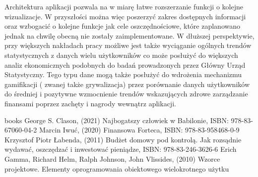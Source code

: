 \documentclass[a4paper, 10pt, twoside, openright]{report}
\begin{document}
\begin{large}
{Architektura aplikacji pozwala na w miarę łatwe rozszerzanie funkcji o kolejne 
wizualizacje. W przyszłości można więc poszerzyć zakres dostępnych informacji 
oraz wzbogacić o kolejne funkcje jak cele oszczędnościowe, które zaplanowano 
jednak na chwilę obecną nie zostały zaimplementowane. W dłuższej perspektywie, 
przy większych nakładach pracy możliwe jest także wyciąganie ogólnych trendów 
statystycznych z danych wielu użytkowników co może posłużyć do większych analiz 
ekonomicznych podobnych do badań prowadzonych przez Główny Urząd Statystyczny. 
Tego typu dane mogą także posłużyć do wdrożenia mechanizmu gamifikacji (
zwanej także grywalizacja) \cite{gamifikacja} przez porównanie danych 
użytkowników do średniej i pozytywne wzmocnienie trendów wskazujących zdrowe 
zarządzanie finansami poprzez zachęty i nagrody wewnątrz aplikacji.}

\begin{thebibliography} {books}
     George S. Clason, (2021) Najbogatszy człowiek w Babilonie, ISBN: 978-83-67060-04-2
     Marcin Iwuć, (2020) Finansowa Forteca, ISBN: 978-83-958468-0-9
     Krzysztof Piotr Łabenda, (2011) Budżet domowy pod kontrolą. Jak rozsądnie wydawać, oszczędzać i inwestować pieniądze, ISBN: 978-83-246-3626-6
     Erich Gamma, Richard Helm, Ralph Johnson, John Vlissides, (2010) Wzorce projektowe. Elementy oprogramowania obiektowego wielokrotnego użytku 


\end{thebibliography}
\end{large}
\end{document}
